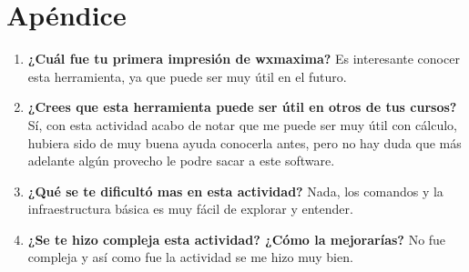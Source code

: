 \documentclass[a4paper]{article}
\begin{document}
\section{Apéndice}
\begin{enumerate}
\item \textbf{¿Cuál fue tu primera impresión de wxmaxima?}
Es interesante conocer esta herramienta, ya que puede ser muy útil en el futuro. 
\item \textbf{¿Crees que esta herramienta puede ser útil en otros de tus cursos?}
Sí, con esta actividad acabo de notar que me puede ser muy útil con cálculo, hubiera sido de muy buena ayuda conocerla antes, pero no hay duda que más adelante algún provecho le podre sacar a este software. 
\item \textbf{¿Qué se te dificultó mas en esta actividad?}
Nada, los comandos y la infraestructura básica es muy fácil de explorar y entender.
\item \textbf{¿Se te hizo compleja esta actividad? ¿Cómo la mejorarías?}
No fue compleja y así como fue la actividad se me hizo muy bien. 
\end{enumerate}
\end{document}
